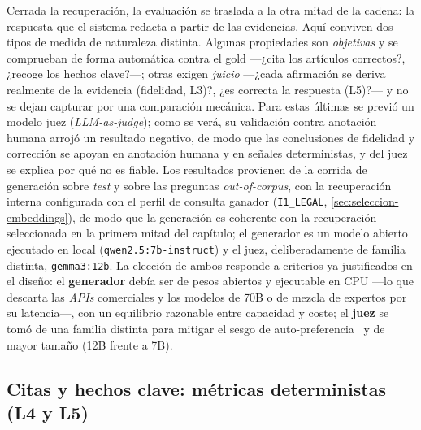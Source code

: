 Cerrada la recuperación, la evaluación se traslada a la otra mitad de la cadena: la respuesta que el sistema redacta a partir de las evidencias. Aquí conviven dos tipos de medida de naturaleza distinta. Algunas propiedades son \emph{objetivas} y se comprueban de forma automática contra el gold —¿cita los artículos correctos?, ¿recoge los hechos clave?—; otras exigen \emph{juicio} —¿cada afirmación se deriva realmente de la evidencia (fidelidad, L3)?, ¿es correcta la respuesta (L5)?— y no se dejan capturar por una comparación mecánica. Para estas últimas se previó un modelo juez (\emph{LLM-as-judge}); como se verá, su validación contra anotación humana arrojó un resultado negativo, de modo que las conclusiones de fidelidad y corrección se apoyan en anotación humana y en señales deterministas, y del juez se explica por qué no es fiable. Los resultados provienen de la corrida de generación sobre \emph{test} y sobre las preguntas \emph{out-of-corpus}, con la recuperación interna configurada con el perfil de consulta ganador (\texttt{I1\_LEGAL}, \ref{sec:seleccion-embeddings}), de modo que la generación es coherente con la recuperación seleccionada en la primera mitad del capítulo; el generador es un modelo abierto ejecutado en local (\texttt{qwen2.5:7b-instruct}) y el juez, deliberadamente de familia distinta, \texttt{gemma3:12b}. La elección de ambos responde a criterios ya justificados en el diseño: el \textbf{generador} debía ser de pesos abiertos y ejecutable en CPU —lo que descarta las \emph{APIs} comerciales y los modelos de 70B o de mezcla de expertos por su latencia—, con un equilibrio razonable entre capacidad y coste; el \textbf{juez} se tomó de una familia distinta para mitigar el sesgo de auto-preferencia~\cite{zheng2023judge} y de mayor tamaño (12B frente a 7B).

\subsection{Citas y hechos clave: métricas deterministas (L4 y L5)}
\label{subsec:gen-deterministas}

